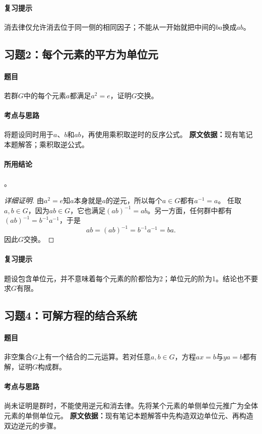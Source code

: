 \paragraph{复习提示}
消去律仅允许消去位于同一侧的相同因子；不能从一开始就把中间的$ba$换成$ab$。

\subsection{习题2：每个元素的平方为单位元}
\paragraph{题目}
若群$G$中的每个元素$a$都满足$a^2=e$，证明$G$交换。
\paragraph{考点与思路}
将题设同时用于$a$、$b$和$ab$，再使用乘积取逆时的反序公式。
\textbf{原文依据：}现有笔记本题解答；乘积取逆公式。
\paragraph{所用结论}
。
\begin{proof}[详细证明]
由$a^2=e$知$a$本身就是$a$的逆元，所以每个$a\in G$都有$a^{-1}=a$。
任取$a,b\in G$，因为$ab\in G$，它也满足$(ab)^{-1}=ab$。另一方面，任何群中都有$(ab)^{-1}=b^{-1}a^{-1}$，于是
\[
ab=(ab)^{-1}=b^{-1}a^{-1}=ba.
\]
因此$G$交换。
\end{proof}
\paragraph{复习提示}
题设包含单位元，并不意味着每个元素的阶都恰为2；单位元的阶为1。结论也不要求$G$有限。

\subsection{习题4：可解方程的结合系统}
\paragraph{题目}
非空集合$G$上有一个结合的二元运算。若对任意$a,b\in G$，方程$ax=b$与$ya=b$都有解，证明$G$构成群。
\paragraph{考点与思路}
尚未证明是群时，不能使用逆元和消去律。先将某个元素的单侧单位元推广为全体元素的单侧单位元。
\textbf{原文依据：}现有笔记本题解答中先构造双边单位元、再构造双边逆元的步骤。
